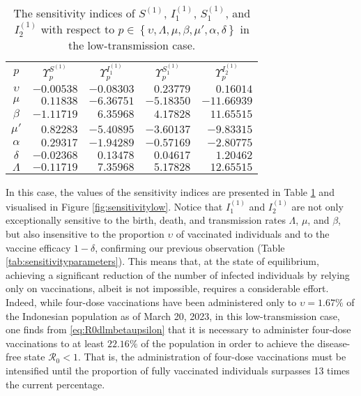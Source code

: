 \documentclass[11pt,reqno]{amsart}
\newcommand{\cR}{\mathcal{R}}
\begin{document}
\begin{table}\renewcommand{\arraystretch}{1.2}
\begin{tabular}{|c|r|r|r|r|}\hline
$p$ & \multicolumn{1}{c|}{$\Upsilon _{p}^{S^{(1)}}$} & \multicolumn{1}{c|}{$\Upsilon _{p}^{I_1^{(1)}}$} & \multicolumn{1}{c|}{$\Upsilon _{p}^{S_1^{(1)}}$} & \multicolumn{1}{c|}{$\Upsilon _{p}^{I_2^{(1)}}$}\\ \hhline{|=|=|=|=|=|}
$\upsilon $ &  $-0.00538$      &$ -0.08303 $      & $0.23779$         & $0.16014$ \\\hline
$\mu $ & $0.11838$         & $-6.36751$         & $-5.18350$         & $-11.66939$            \\\hline
$\beta $ &$ -1.11719$        & $6.35968$ & $4.17828$          & $11.65515$          \\\hline
$\mu'$ & $0.82283$         & $-5.40895$       &$ -3.60137$         & $-9.83315$        \\\hline
$\alpha $ & $0.29317$          & $-1.94289$          &$-0.57169$        & $-2.80775$         \\\hline
$\delta $  & $-0.02368$       & $0.13478$         & $0.04617$        & $1.20462$ \\\hline
$\Lambda $ & $-0.11719$        & $7.35968$          & $5.17828$ & $12.65515$   \\\hline
\end{tabular}\smallskip
\caption{\label{tab:sensitivitylow}The sensitivity indices of $S^{(1)}$, $I_1^{(1)}$, $S_1^{(1)}$, and $I_2^{(1)}$ with respect to $p\in\left\{\upsilon,\Lambda,\mu,\beta,\mu',\alpha,\delta\right\}$ in the low-transmission case.}
\end{table}


In this case, the values of the sensitivity indices are presented in Table \ref{tab:sensitivitylow} and visualised in Figure \ref{fig:sensitivitylow}. Notice that $I_1^{(1)}$ and $I_2^{(1)}$ are not only exceptionally sensitive to the birth, death, and transmission rates $\Lambda$, $\mu$, and $\beta$, but also insensitive to the proportion $\upsilon$ of vaccinated individuals and to the vaccine efficacy $1-\delta$, confirming our previous observation (Table \ref{tab:sensitivityparameters}). This means that, at the state of equilibrium, achieving a significant reduction of the number of infected individuals by relying only on vaccinations, albeit is not impossible, requires a considerable effort. Indeed, while four-dose vaccinations have been administered only to $\upsilon=1.67\%$ of the Indonesian population as of March 20, 2023, in this low-transmission case, one finds from \eqref{eq:R0dlmbetaupsilon} that it is necessary to administer four-dose vaccinations to at least $22.16\%$ of the population in order to achieve the disease-free state $\cR_0<1$. That is, the administration of four-dose vaccinations must be intensified until the proportion of fully vaccinated individuals surpasses 13 times the current percentage.
\end{document}
